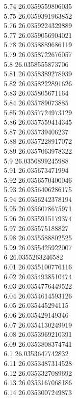 {5.74	26.0359559806035\\
5.75	26.0359391963852\\
5.76	26.0359224329889\\
5.77	26.0359056904021\\
5.78	26.0358889686119\\
5.79	26.0358722676057\\
5.8	26.0358555873706\\
5.81	26.0358389278939\\
5.82	26.0358222891626\\
5.83	26.035805671164\\
5.84	26.035789073885\\
5.85	26.0357724973129\\
5.86	26.0357559414345\\
5.87	26.035739406237\\
5.88	26.0357228917072\\
5.89	26.0357063978322\\
5.9	26.0356899245988\\
5.91	26.035673471994\\
5.92	26.0356570400046\\
5.93	26.0356406286175\\
5.94	26.0356242378194\\
5.95	26.0356078675971\\
5.96	26.0355915179374\\
5.97	26.035575188827\\
5.98	26.0355588802525\\
5.99	26.0355425922007\\
6	26.0355263246582\\
6.01	26.0355100776116\\
6.02	26.0354938510474\\
6.03	26.0354776449522\\
6.04	26.0354614593126\\
6.05	26.035445294115\\
6.06	26.035429149346\\
6.07	26.0354130249919\\
6.08	26.0353969210391\\
6.09	26.0353808374741\\
6.1	26.0353647742832\\
6.11	26.0353487314528\\
6.12	26.0353327089692\\
6.13	26.0353167068186\\
6.14	26.0353007249873\\
}
